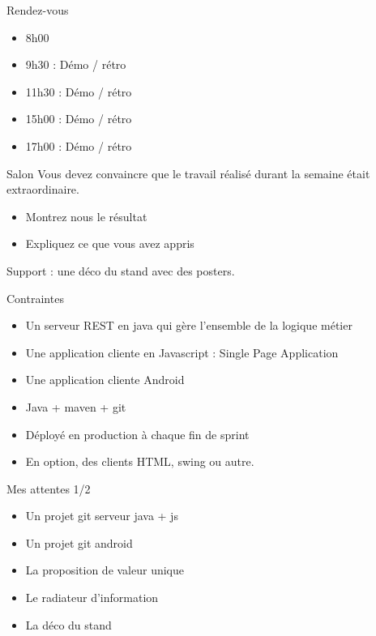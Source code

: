 \documentclass{beamer}
\begin{document}
\begin{frame}{Rendez-vous}
  \begin{itemize}
    \item 8h00
    \item 9h30 : Démo / rétro
    \item 11h30 : Démo / rétro
    \item 15h00 : Démo / rétro
    \item 17h00 : Démo / rétro
  \end{itemize}
\end{frame}

\begin{frame}{Salon}
  Vous devez convaincre que le travail réalisé durant la semaine était extraordinaire.
  \begin{itemize}
    \item Montrez nous le résultat
    \item Expliquez ce que vous avez appris
  \end{itemize}

  Support : une déco du stand avec des posters.

\end{frame}

\begin{frame}{Contraintes}
  \begin{itemize}
    \item Un serveur REST en java qui gère l'ensemble de la logique métier
    \item Une application cliente en Javascript : Single Page Application
    \item Une application cliente Android
    \item Java + maven + git
    \item Déployé en production à chaque fin de sprint
    \item En option, des clients HTML, swing ou autre.
  \end{itemize}
\end{frame}

\begin{frame}{Mes attentes 1/2}
  \begin{itemize}
    \item Un projet git serveur java + js
    \item Un projet git android
    \item La proposition de valeur unique
    \item Le radiateur d'information
    \item La déco du stand
  \end{itemize}
\end{frame}
\end{document}
